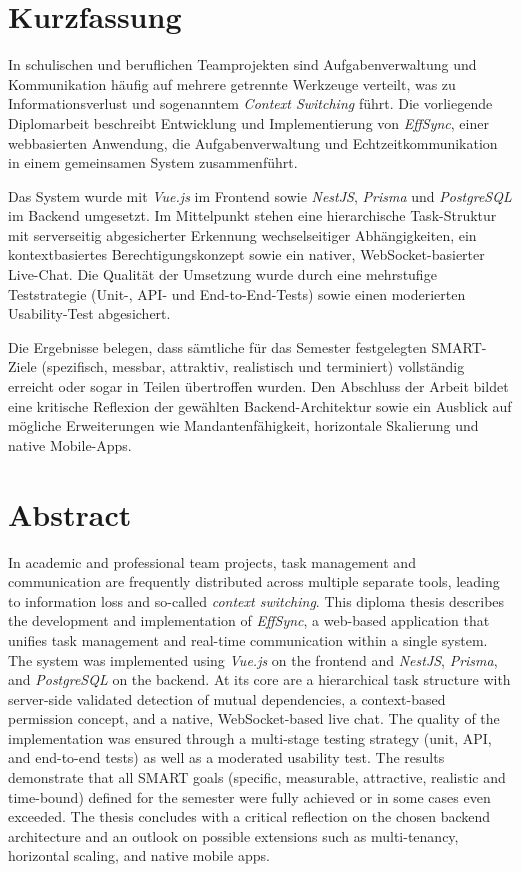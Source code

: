 \chapter*{Kurzfassung}

In schulischen und beruflichen Teamprojekten sind Aufgabenverwaltung und Kommunikation
häufig auf mehrere getrennte Werkzeuge verteilt, was zu Informationsverlust und
sogenanntem \textit{Context Switching} führt. Die vorliegende Diplomarbeit beschreibt
Entwicklung und Implementierung von \textit{EffSync}, einer webbasierten Anwendung, die
Aufgabenverwaltung und Echtzeitkommunikation in einem gemeinsamen System zusammenführt.

Das System wurde mit \textit{Vue.js} im Frontend sowie \textit{NestJS}, \textit{Prisma}
und \textit{PostgreSQL} im Backend umgesetzt. Im Mittelpunkt stehen eine hierarchische Task-Struktur mit serverseitig abgesicherter Erkennung wechselseitiger Abhängigkeiten, ein kontextbasiertes Berechtigungskonzept sowie ein nativer, WebSocket-basierter Live-Chat. Die Qualität der
Umsetzung wurde durch eine mehrstufige Teststrategie (Unit-, API- und End-to-End-Tests)
sowie einen moderierten Usability-Test abgesichert.

Die Ergebnisse belegen, dass sämtliche für das Semester festgelegten SMART-Ziele (spezifisch, messbar, attraktiv, realistisch und terminiert) vollständig erreicht oder sogar in Teilen übertroffen wurden. Den Abschluss der Arbeit bildet eine kritische Reflexion der gewählten Backend-Architektur sowie ein Ausblick auf mögliche Erweiterungen wie Mandantenfähigkeit, horizontale Skalierung und native Mobile-Apps.
\vspace{1cm}

\chapter*{Abstract}

In academic and professional team projects, task management and communication are
frequently distributed across multiple separate tools, leading to information loss and
so-called \textit{context switching}. This diploma thesis describes the development and
implementation of \textit{EffSync}, a web-based application that unifies task management
and real-time communication within a single system. The system was implemented using
\textit{Vue.js} on the frontend and \textit{NestJS}, \textit{Prisma}, and \textit{PostgreSQL}
on the backend. At its core are a hierarchical task structure with server-side validated
detection of mutual dependencies, a context-based permission concept, and a native,
WebSocket-based live chat. The quality of the implementation was ensured through a
multi-stage testing strategy (unit, API, and end-to-end tests) as well as a moderated
usability test.
The results demonstrate that all SMART goals (specific, measurable, attractive, realistic
and time-bound) defined for the semester were fully achieved or in some cases even
exceeded. The thesis concludes with a critical reflection on the chosen backend
architecture and an outlook on possible extensions such as multi-tenancy, horizontal
scaling, and native mobile apps.
